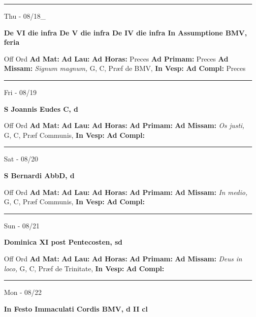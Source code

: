 \documentclass[letterpaper, 10pt]{article}
\begin{document}
\hrule
\begin{center}
Thu - 08/18\_
\end{center}\textbf{ \large De VI die infra De V die infra De IV die infra In Assumptione BMV, \textnormal{\normalsize feria}}
\begin{justify}
Off Ord
\textbf{Ad Mat: }
\textbf{Ad Lau: }
\textbf{Ad Horas: }Preces
\textbf{Ad Primam: }Preces
\textbf{Ad Missam:} \textit{Signum magnum, } G, C, Præf de BMV, 
\textbf{In Vesp: }
\textbf{Ad Compl: }Preces\end{justify}



\hrule
\begin{center}
Fri - 08/19
\end{center}\textbf{ \large S Joannis Eudes C, \textnormal{\normalsize d}}
\begin{justify}
Off Ord
\textbf{Ad Mat: }
\textbf{Ad Lau: }
\textbf{Ad Horas: }
\textbf{Ad Primam: }
\textbf{Ad Missam:} \textit{Os justi, } G, C, Præf Communis, 
\textbf{In Vesp: }
\textbf{Ad Compl: }\end{justify}



\hrule
\begin{center}
Sat - 08/20
\end{center}\textbf{ \large S Bernardi AbbD, \textnormal{\normalsize d}}
\begin{justify}
Off Ord
\textbf{Ad Mat: }
\textbf{Ad Lau: }
\textbf{Ad Horas: }
\textbf{Ad Primam: }
\textbf{Ad Missam:} \textit{In medio, } G, C, Præf Communis, 
\textbf{In Vesp: }
\textbf{Ad Compl: }\end{justify}



\hrule
\begin{center}
Sun - 08/21
\end{center}\textbf{ \large Dominica XI post Pentecosten, \textnormal{\normalsize sd}}
\begin{justify}
Off Ord
\textbf{Ad Mat: }
\textbf{Ad Lau: }
\textbf{Ad Horas: }
\textbf{Ad Primam: }
\textbf{Ad Missam:} \textit{Deus in loco, } G, C, Præf de Trinitate, 
\textbf{In Vesp: }
\textbf{Ad Compl: }\end{justify}



\hrule
\begin{center}
Mon - 08/22
\end{center}\textbf{ \large In Festo Immaculati Cordis BMV, \textnormal{\normalsize d II cl}}
\end{document}
